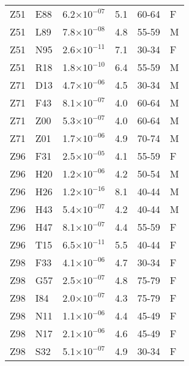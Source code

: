 \begin{longtable}{lllrll}
   Z51 & E88 & 6.2$\times10^{-07}$ & 5.1 & 60-64 & F \\ 
   Z51 & L89 & 7.8$\times10^{-08}$ & 4.8 & 55-59 & M \\ 
   Z51 & N95 & 2.6$\times10^{-11}$ & 7.1 & 30-34 & F \\ 
   Z51 & R18 & 1.8$\times10^{-10}$ & 6.4 & 55-59 & M \\ 
   Z71 & D13 & 4.7$\times10^{-06}$ & 4.5 & 30-34 & M \\ 
   Z71 & F43 & 8.1$\times10^{-07}$ & 4.0 & 60-64 & M \\ 
   Z71 & Z00 & 5.3$\times10^{-07}$ & 4.0 & 60-64 & M \\ 
   Z71 & Z01 & 1.7$\times10^{-06}$ & 4.9 & 70-74 & M \\ 
   Z96 & F31 & 2.5$\times10^{-05}$ & 4.1 & 55-59 & F \\ 
   Z96 & H20 & 1.2$\times10^{-06}$ & 4.2 & 50-54 & M \\ 
   Z96 & H26 & 1.2$\times10^{-16}$ & 8.1 & 40-44 & M \\ 
   Z96 & H43 & 5.4$\times10^{-07}$ & 4.2 & 40-44 & M \\ 
   Z96 & H47 & 8.1$\times10^{-07}$ & 4.4 & 55-59 & F \\ 
   Z96 & T15 & 6.5$\times10^{-11}$ & 5.5 & 40-44 & F \\ 
   Z98 & F33 & 4.1$\times10^{-06}$ & 4.7 & 30-34 & F \\ 
   Z98 & G57 & 2.5$\times10^{-07}$ & 4.8 & 75-79 & F \\ 
   Z98 & I84 & 2.0$\times10^{-07}$ & 4.3 & 75-79 & F \\ 
   Z98 & N11 & 1.1$\times10^{-06}$ & 4.4 & 45-49 & F \\ 
   Z98 & N17 & 2.1$\times10^{-06}$ & 4.6 & 45-49 & F \\ 
   Z98 & S32 & 5.1$\times10^{-07}$ & 4.9 & 30-34 & F \\ 
   \hline
\end{longtable}
